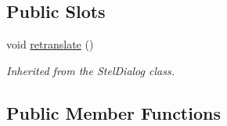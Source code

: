 \subsection*{Public Slots}
\begin{DoxyCompactItemize}
\item 
void \mbox{\hyperlink{class_autoscope_picture_window_form_a4bcc43707d7b76b19d81ffc66a4b7ee2}{retranslate}} ()
\begin{DoxyCompactList}\small\item\em Inherited from the Stel\+Dialog class. \end{DoxyCompactList}\end{DoxyCompactItemize}
\subsection*{Public Member Functions}
